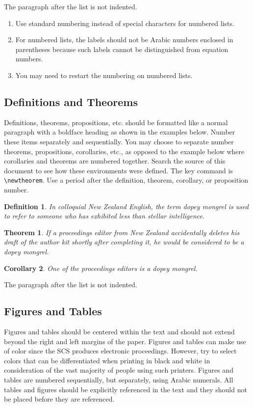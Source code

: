 \documentclass{scspaperproc}
\theoremstyle{scsthe}
\newtheorem{theorem}{Theorem}
\newtheorem{corollary}[theorem]{Corollary}
\newtheorem{definition}{Definition}
\begin{document}
The paragraph after the list is not indented.
\begin{enumerate}
	\item Use standard numbering instead of special characters for numbered lists.
	\item For numbered lists, the labels should not be Arabic numbers enclosed in parentheses because such labels cannot be distinguished from equation numbers.
	\item You may need to restart the numbering on numbered lists.
\end{enumerate}


\subsection{Definitions and Theorems}
Definitions, theorems, propositions, etc. should be formatted like a normal paragraph with a boldface heading as shown in the examples below. Number these items separately and sequentially. You may choose to separate number theorems, propositions, corollaries, etc., as opposed to the example below where corollaries and theorems are numbered together. Search the source of this document to see how these environments were defined. The key command is \verb+\newtheorem+. Use a period after the definition, theorem, corollary, or proposition number.

\begin{definition}
In colloquial New Zealand English, the term \emph{dopey mongrel} is used to refer to someone who has exhibited less than stellar intelligence.
\end{definition}

\begin{theorem}
If a proceedings editor from New Zealand accidentally deletes his draft of the author kit shortly after completing it, he would be considered to be a dopey mongrel.
\end{theorem}

\begin{corollary}
One of the proceedings editors is a dopey mongrel.
\end{corollary}

The paragraph after the list is not indented.


\subsection{Figures and Tables}
\label{sec:graphics}
Figures and tables should be centered within the text and should not extend beyond the right and left margins of the paper. Figures and tables can make use of color since the SCS produces electronic proceedings. However, try to select colors that can be differentiated when printing in black and white in consideration of the vast majority of people using such printers. Figures and tables are numbered sequentially, but separately, using Arabic numerals. All tables and figures should be explicitly referenced in the text and they should not be placed before they are referenced.
\end{document}
